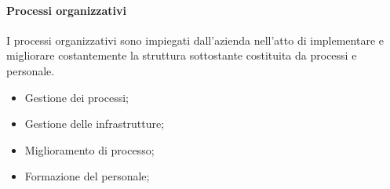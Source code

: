 \paragraph{Processi organizzativi}
I processi organizzativi sono impiegati dall'azienda nell'atto di implementare e migliorare costantemente la struttura sottostante costituita da processi e personale.

\begin{itemize}
	\item Gestione dei processi;
	\item Gestione delle infrastrutture;
	\item Miglioramento di processo;
	\item Formazione del personale;
\end{itemize}

